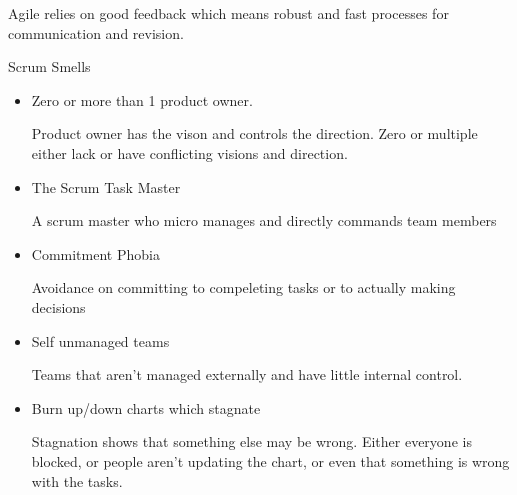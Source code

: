 \documentclass{report}
\begin{document}
\begin{description}
\begin{itemize}
\begin{mdframed}
                    Agile relies on good feedback which means
                    robust and fast processes for communication
                    and revision.
                \end{mdframed}
        \end{itemize}
    \item Scrum Smells
        \begin{itemize}
            \item Zero or more than 1 product owner.
                \begin{mdframed}
                    Product owner has the vison and controls
                    the direction. Zero or multiple either
                    lack or have conflicting visions and direction.
                \end{mdframed}
            \item The Scrum Task Master
                \begin{mdframed}
                    A scrum master who micro manages and directly
                    commands team members
                \end{mdframed}
            \item Commitment Phobia
                \begin{mdframed}
                    Avoidance on committing to compeleting tasks
                    or to actually making decisions
                \end{mdframed}
            \item Self unmanaged teams
                \begin{mdframed}
                    Teams that aren't managed externally
                    and have little internal control.
                \end{mdframed}
            \item Burn up/down charts which stagnate
                \begin{mdframed}
                    Stagnation shows that something else
                    may be wrong. Either everyone is blocked,
                    or people aren't updating the chart,
                    or even that something is wrong with the
                    tasks.


\end{mdframed}
\end{itemize}
\end{description}
\end{document}
